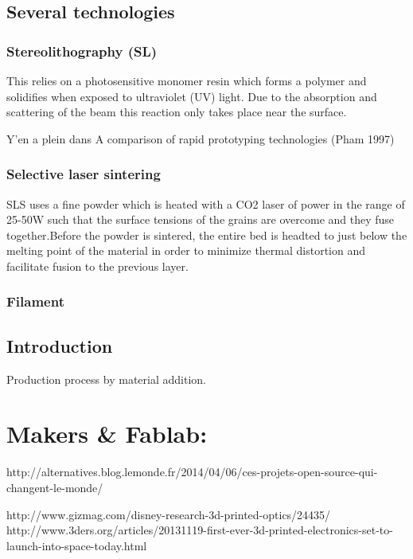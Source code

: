\subsection{Several technologies} %

\subsubsection{Stereolithography (SL)} %

This relies on a photosensitive monomer resin which forms a polymer and solidifies when exposed to ultraviolet (UV) light.
Due to the absorption and scattering of the beam this reaction only takes place near the surface.

Y'en a plein dans A comparison of rapid prototyping technologies (Pham 1997)

\subsubsection{Selective laser sintering} %
SLS uses a fine powder which is heated with a CO2 laser of power in the range of 25-50W such that the surface tensions of the grains are overcome and they fuse together.Before the powder is sintered, the entire bed is headted to just below the melting point of the material in order to minimize thermal distortion and facilitate fusion to the previous layer.

\subsubsection{Filament} %




\subsection{Introduction} %

Production process by material addition.



\section{Makers \& Fablab: } %

http://alternatives.blog.lemonde.fr/2014/04/06/ces-projets-open-source-qui-changent-le-monde/



http://www.gizmag.com/disney-research-3d-printed-optics/24435/
http://www.3ders.org/articles/20131119-first-ever-3d-printed-electronics-set-to-launch-into-space-today.html
